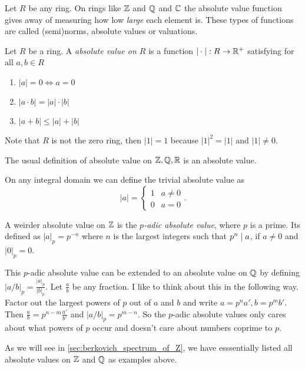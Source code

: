 Let $R$ be any ring. On rings like $\mathbb{Z}$ and $\mathbb{Q}$ and $\mathbb{C}$ the absolute value function gives away of measuring how low \emph{large} each element is. 
These types of functions are called (semi)norms, absolute values or valuations. 
\begin{definition}
	Let $R$ be a ring. A \emph{absolute value on $R$} is a function $|\cdot |: R \to \mathbb{R}^{+}$ satisfying for all $a, b \in R$
	\begin{enumerate}
		\item $|a| = 0 \iff a = 0$ 
		\item $|a \cdot b| = |a| \cdot |b|$ 
		\item $|a + b| \le |a| + |b|$
	\end{enumerate}
\end{definition}
Note that $R$ is not the zero ring, then $|1| = 1$ because $|1|^2 = |1| $ and $|1|\ne 0 $. 
\begin{example}
	The usual definition of absolute value on $\mathbb{Z}, \mathbb{Q}, \mathbb{R}$ is an absolute value. 
\end{example}
\begin{example}
	On any integral domain we can define the trivial absolute value as \[
	 |a| = \begin{cases}
		 1 & a \ne 0 \\
		 0 & a = 0
	 \end{cases}
	.\] 
\end{example}
\begin{example}
	A weirder absolute value on $\mathbb{Z}$ is the \emph{$p$-adic absolute value}, where $p$ is a prime. 
	Its defined as $|a|_p = p^{-n}$ where $n$ is the largest integers such that $p^{n} \mid a$, if $a \ne 0$ and $|0|_p = 0$. 


	This $p$-adic absolute value can be extended to an absolute value on $\mathbb{Q}$ by defining $|a / b|_p = \frac{|a|_p}{|b|_p}$. Let $\frac{a}{b}$ be any fraction. 
	I like to think about this in the following way. 
	Factor out the largest powers of $p$ out of $a$ and $b$ and write $a = p^{n} a', b = p^{m} b'$. Then $\frac{a}{ b} = p^{n - m} \frac{a'}{ b'}$ and $|a / b|_p = p^{m - n}$. 
	So the $p$-adic absolute values only cares about what powers of $p$ occur and doesn't care about numbers coprime to $p $.
\end{example}
As we will see in \cref{sec:berkovich_spectrum_of_Z}, we have esssentially listed all absolute values on $\mathbb{Z}$ and $\mathbb{Q}$ as examples above.  

